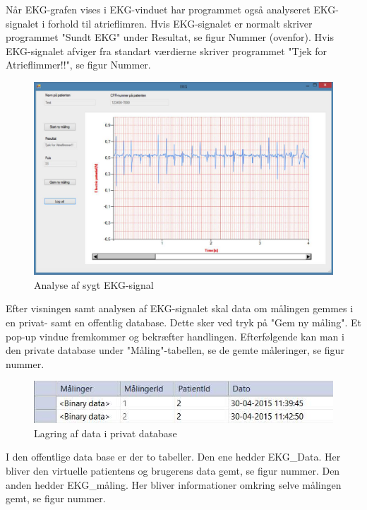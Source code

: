 Når EKG-grafen vises i EKG-vinduet har programmet også analyseret EKG-signalet i forhold til atrieflimren. Hvis EKG-signalet er normalt skriver programmet "Sundt EKG" under Resultat, se figur Nummer (ovenfor). Hvis EKG-signalet afviger fra standart værdierne skriver programmet "Tjek for Atrieflimmer!!", se figur Nummer. 

\begin{figure}[H]
	\centering
	\includegraphics[width=1\textwidth]{Figurer/Snip20150525_26}
	\caption{Analyse af sygt EKG-signal}
\end{figure}

Efter visningen samt analysen af EKG-signalet skal data om målingen gemmes i en privat- samt en offentlig database. Dette sker ved tryk på "Gem ny måling". Et pop-up vindue fremkommer og bekræfter handlingen. Efterfølgende kan man i den private database under "Måling"\--tabellen, se de gemte måleringer, se figur nummer.   

\begin{figure}[H]
	\centering
	\includegraphics[width=1\textwidth]{Figurer/Snip20150525_27}	
	\caption{Lagring af data i privat database}
\end{figure}

I den offentlige data base er der to tabeller. Den ene hedder EKG\_Data. Her bliver den virtuelle patientens og brugerens data gemt, se figur nummer. Den anden hedder EKG\_måling. Her bliver informationer omkring selve målingen gemt, se figur nummer. 

